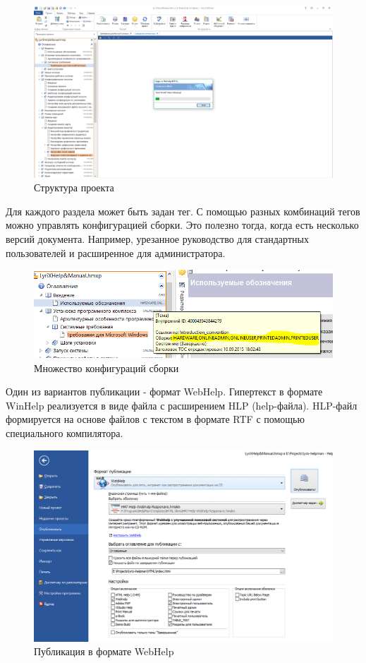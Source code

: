 		\begin{figure}[h]
			\centering
			\includegraphics[width=0.7\linewidth]{images/creation}
			\caption{Структура проекта}
			\label{fig:creation}
		\end{figure}
	
		\FloatBarrier
	
		Для каждого раздела может быть задан тег. С помощью разных комбинаций тегов можно управлять конфигурацией сборки. Это полезно тогда, когда есть несколько версий документа. Например, урезанное руководство для стандартных пользователей и расширенное для администратора.
				
		\begin{figure}[h]
			\centering
			\includegraphics[width=0.7\linewidth]{images/multiple-builds}
			\caption{Множество конфигураций сборки}
			\label{fig:multiple-builds}
		\end{figure}
	
	
		\FloatBarrier
		Один из вариантов публикации - формат WebHelp. Гипертекст в формате WinHelp реализуется в виде файла с расширением HLP (help-файла). HLP-файл формируется на основе файлов с текстом в формате RTF с помощью специального компилятора.
	
		\begin{figure}[h]
			\centering
			\includegraphics[width=0.7\linewidth]{images/publishing}
			\caption{Публикация в формате WebHelp}
			\label{fig:publishing}
		\end{figure}
	

